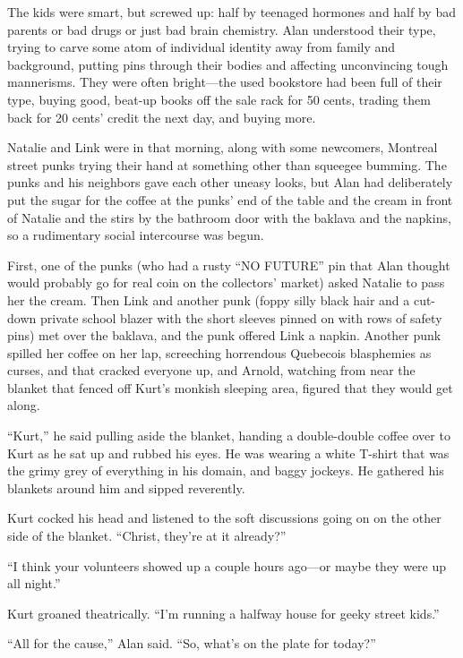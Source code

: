 The kids were smart, but screwed up:  half by teenaged hormones and
half by bad parents or bad drugs or just bad brain chemistry.  Alan
understood their type, trying to carve some atom of individual
identity away from family and background, putting pins through their
bodies and affecting unconvincing tough mannerisms.  They were often
bright---the used bookstore had been full of their type, buying good,
beat-up books off the sale rack for 50 cents, trading them back for 20
cents' credit the next day, and buying more.

Natalie and Link were in that morning, along with some newcomers,
Montreal street punks trying their hand at something other than
squeegee bumming.  The punks and his neighbors gave each other uneasy
looks, but Alan had deliberately put the sugar for the coffee at the
punks' end of the table and the cream in front of Natalie and the
stirs by the bathroom door with the baklava and the napkins, so a
rudimentary social intercourse was begun.

First, one of the punks (who had a rusty ``NO FUTURE'' pin that Alan
thought would probably go for real coin on the collectors' market)
asked Natalie to pass her the cream.  Then Link and another punk
(foppy silly black hair and a cut-down private school blazer with the
short sleeves pinned on with rows of safety pins) met over the
baklava, and the punk offered Link a napkin.  Another punk spilled her
coffee on her lap, screeching horrendous Quebecois blasphemies as
curses, and that cracked everyone up, and Arnold, watching from near
the blanket that fenced off Kurt's monkish sleeping area, figured that
they would get along.

``Kurt,'' he said pulling aside the blanket, handing a double-double
coffee over to Kurt as he sat up and rubbed his eyes.  He was wearing
a white T-shirt that was the grimy grey of everything in his domain,
and baggy jockeys.  He gathered his blankets around him and sipped
reverently.

Kurt cocked his head and listened to the soft discussions going on on
the other side of the blanket.  ``Christ, they're at it already?''

``I think your volunteers showed up a couple hours ago---or maybe they
were up all night.''

Kurt groaned theatrically.  ``I'm running a halfway house for geeky
street kids.''

``All for the cause,'' Alan said.  ``So, what's on the plate for
today?''

